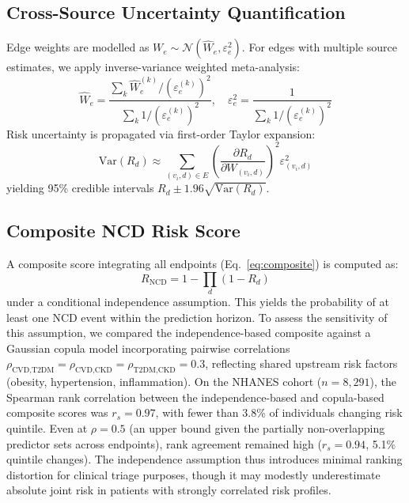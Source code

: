\documentclass[runningheads]{llncs}
\begin{document}
\subsection{Cross-Source Uncertainty Quantification}\label{sec:uncert}

Edge weights are modelled as $W_e \sim \mathcal{N}(\hat{W}_e,
\varepsilon_e^2)$.
For edges with multiple source estimates, we apply inverse-variance
weighted meta-analysis:
\begin{equation}\label{eq:meta}
\hat{W}_e = \frac{\sum_k \hat{W}_e^{(k)} / (\varepsilon_e^{(k)})^2}
{\sum_k 1 / (\varepsilon_e^{(k)})^2}, \quad
\varepsilon_e^2 = \frac{1}{\sum_k 1 / (\varepsilon_e^{(k)})^2}
\end{equation}
Risk uncertainty is propagated via first-order Taylor expansion:
\begin{equation}\label{eq:riskvar}
\mathrm{Var}(R_d) \approx \sum_{(v_i,d) \in E}
\left(\frac{\partial R_d}{\partial W_{(v_i,d)}}\right)^2 \varepsilon_{(v_i,d)}^2
\end{equation}
yielding 95\% credible intervals $R_d \pm 1.96\sqrt{\mathrm{Var}(R_d)}$.

\subsection{Composite NCD Risk Score}\label{sec:composite}

A composite score integrating all endpoints (Eq.~\ref{eq:composite})
is computed as:
\begin{equation}\label{eq:composite}
R_{\mathrm{NCD}} = 1 - \prod_{d} (1 - R_d)
\end{equation}
under a conditional independence assumption.
This yields the probability of at least one NCD event within the
prediction horizon.
To assess the sensitivity of this assumption, we compared the
independence-based composite against a Gaussian copula model
incorporating pairwise correlations
$\rho_{\text{CVD,T2DM}} = \rho_{\text{CVD,CKD}} = \rho_{\text{T2DM,CKD}} = 0.3$,
reflecting shared upstream risk factors (obesity, hypertension,
inflammation).
On the NHANES cohort ($n = 8{,}291$), the Spearman rank correlation
between the independence-based and copula-based composite scores was
$r_s = 0.97$, with fewer than 3.8\% of individuals changing risk
quintile.
Even at $\rho = 0.5$ (an upper bound given the partially
non-overlapping predictor sets across endpoints), rank agreement
remained high ($r_s = 0.94$, 5.1\% quintile changes).
The independence assumption thus introduces minimal ranking distortion
for clinical triage purposes, though it may modestly underestimate
absolute joint risk in patients with strongly correlated risk
profiles.
\end{document}
